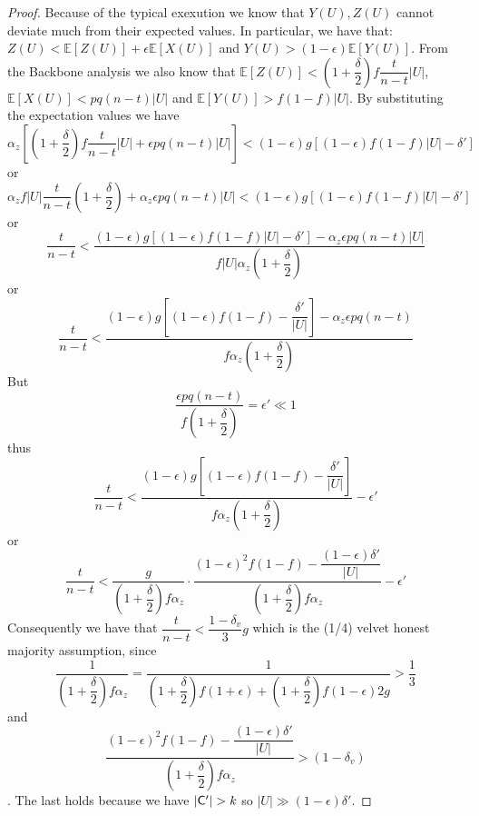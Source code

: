 \begin{proof}
Because of the typical exexution we know that $Y(U), Z(U)$ cannot deviate much from their expected values. In particular, we have that\cite{backbone}: $Z(U) < \mathbb{E}[Z(U)] + \epsilon \mathbb{E}[X(U)]$ and $Y(U) > (1-\epsilon)\mathbb{E}[Y(U)]$. From the Backbone analysis we also know that $\mathbb{E}[Z(U)] < (1+\dfrac{\delta}{2})f\dfrac{t}{n-t} \lvert U \rvert$, $\mathbb{E}[X(U)] < pq(n-t) \lvert U \rvert$ and $\mathbb{E}[Y(U)] > f(1-f) \lvert U \rvert$. By substituting the expectation values we have $ \alpha_z[(1+\dfrac{\delta}{2})f \dfrac{t}{n-t} \lvert U \rvert + \epsilon pq(n-t) \lvert U \rvert ] < (1- \epsilon)g[ (1-\epsilon)f(1-f) \lvert U \rvert - \delta' ] $ or $ \alpha_z f \lvert U \rvert \dfrac{t}{n-t}(1 + \dfrac{\delta}{2}) + \alpha_z \epsilon pq(n-t) \lvert U \rvert < (1- \epsilon)g[ (1-\epsilon)f(1-f) \lvert U \rvert - \delta' ] $ or \begin{equation*}
    \dfrac{t}{n-t} < \dfrac{ (1- \epsilon)g[ (1-\epsilon)f(1-f) \lvert U \rvert - \delta' ] - \alpha_z \epsilon pq(n-t) \lvert U \rvert }  { f \lvert U \rvert \alpha_z (1 + \dfrac{\delta}{2})}
\end{equation*} or \begin{equation*}
    \dfrac{t}{n-t} < \dfrac{  (1- \epsilon)g[ (1-\epsilon)f(1-f) - \dfrac{\delta'}{\lvert U \rvert} ] - \alpha_z \epsilon pq(n-t) }  { f \alpha_z (1 + \dfrac{\delta}{2})}
\end{equation*} But \begin{equation*}
    \dfrac{\epsilon pq(n-t)}{f(1+\dfrac{\delta}{2})} = \epsilon' \ll 1
\end{equation*} thus \begin{equation*}
    \dfrac{t}{n-t} < \dfrac{  (1- \epsilon)g[ (1-\epsilon)f(1-f) - \dfrac{\delta'}{\lvert U \rvert} ] }  { f \alpha_z (1 + \dfrac{\delta}{2})} - \epsilon'
\end{equation*} or \begin{equation*}
    \dfrac{t}{n-t} < \dfrac{g}{(1+\dfrac{\delta}{2})f\alpha_z} \cdot \dfrac{(1-\epsilon)^2 f(1-f) - \dfrac{(1-\epsilon)\delta'}{\lvert U \rvert} }{(1+\dfrac{\delta}{2})f\alpha_z} - \epsilon'
\end{equation*} Consequently we have that $\dfrac{t}{n-t} < \dfrac{1-\delta_v}{3}g$ which is the (1/4) velvet honest majority assumption, since \begin{equation*}
    \dfrac{1}{(1+\dfrac{\delta}{2})f\alpha_z} = \dfrac{1}{(1+\dfrac{\delta}{2})f(1+\epsilon) + (1+\dfrac{\delta}{2})f(1-\epsilon)2g} > \dfrac{1}{3}
\end{equation*} and \begin{equation*}
    \dfrac{(1-\epsilon)^2 f(1-f) - \dfrac{(1-\epsilon)\delta'}{\lvert U \rvert} }{(1+\dfrac{\delta}{2})f\alpha_z} > (1 - \delta_v)
\end{equation*}. The last holds because we have $\lvert \mathsf{C}' \rvert > k$ so $\lvert U \rvert \gg (1-\epsilon)\delta'$.
\end{proof}